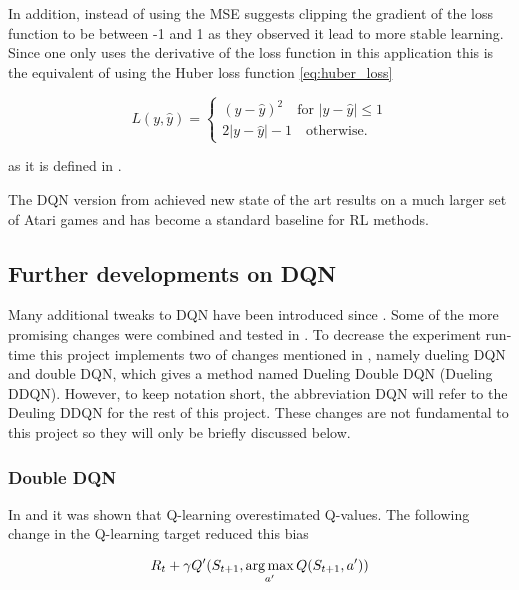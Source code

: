 In addition, instead of using the MSE \cite{mnih_2015} suggests clipping the gradient of the loss function to be between -1 and 1 as they observed it lead to more stable learning. Since one only uses the derivative of the loss function in this application this is the equivalent of using the Huber loss function \ref{eq:huber_loss}

\begin{equation}
    \label{eq:huber_loss}
    L(y, \hat{y}) = \begin{cases}
        (y-\hat{y})^2 \quad \text{for } |y-\hat{y}| \le 1 \\
        2|y-\hat{y}| - 1\quad \text{otherwise}.
    \end{cases}
\end{equation}

as it is defined in \citep[p.~349]{hastie_2009}.

The DQN version from \cite{mnih_2015} achieved new state of the art results on a much larger set of Atari games and has become a standard baseline for RL methods.

\subsection{Further developments on DQN}

Many additional tweaks to DQN have been introduced since \cite{mnih_2015}. Some of the more promising changes were combined and tested in \cite{hessel_2017}. To decrease the experiment run-time this project implements two of changes mentioned in \cite{hessel_2017}, namely dueling DQN and double DQN, which gives a method named Dueling Double DQN (Dueling DDQN). However, to keep notation short, the abbreviation DQN will refer to the Deuling DDQN for the rest of this project. These changes are not fundamental to this project so they will only be briefly discussed below.

\subsubsection{Double DQN}

In \cite{hasselt_2010} and \cite{hasselt_2015} it was shown that Q-learning overestimated Q-values. The following change in the Q-learning target reduced this bias

\begin{equation}
    R_t + \gamma Q'(S_{t+1}, \operatorname*{arg\,max}_{a'}Q(S_{t+1}, a'))
\end{equation}

